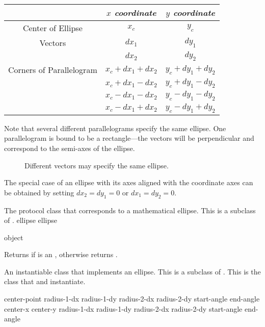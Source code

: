\begin{tabular}{|c|cc|}
 \hline
   & {\sl $x$ coordinate} & {\sl $y$ coordinate} \\
 \hline
 Center of Ellipse & $x_c$ & $y_c$ \\
 \hline
 Vectors & $dx_1$ & $dy_1$ \\
         & $dx_2$ & $dy_2$ \\
 \hline
 Corners of Parallelogram & $x_c + dx_1 + dx_2$ & $y_c + dy_1 + dy_2$ \\
                          & $x_c + dx_1 - dx_2$ & $y_c + dy_1 - dy_2$ \\
                          & $x_c - dx_1 - dx_2$ & $y_c - dy_1 - dy_2$ \\
                          & $x_c - dx_1 + dx_2$ & $y_c - dy_1 + dy_2$ \\
 \hline
\end{tabular}

Note that several different parallelograms specify the same ellipse.  One
parallelogram is bound to be a rectangle---the vectors will be perpendicular
and correspond to the semi-axes of the ellipse.

\begin{figure}
\ifpsfig\centerline{}\else\vspace{1.5in}\fi
\caption{Different vectors may specify the same ellipse.}
\end{figure}

The special case of an ellipse with its axes aligned with the coordinate axes
can be obtained by setting $dx_2 = dy_1 = 0$ or $dx_1 = dy_2 = 0$.



The protocol class that corresponds to a mathematical ellipse.  This is a
subclass of .
 {ellipse} {ellipse}

 {object}

Returns  if  is an , otherwise returns
.


An instantiable class that implements an ellipse.  This is a subclass of
.  This is the class that  and 
instantiate.
\Immutable

  {center-point 
                        radius-1-dx radius-1-dy radius-2-dx radius-2-dy
                        \key start-angle end-angle}
 {center-x center-y 
                        radius-1-dx radius-1-dy radius-2-dx radius-2-dy 
                        \key start-angle end-angle}

